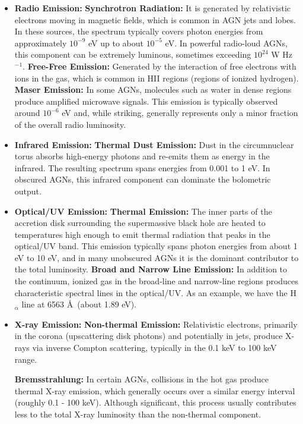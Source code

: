 \begin{itemize}
    \item \textbf{Radio Emission:}
    \subitem \textbf{Synchrotron Radiation:} It is generated by relativistic electrons moving in magnetic fields, which is common in AGN jets and lobes. In these sources, the spectrum typically covers photon energies from approximately $10^{-9}$ eV up to about $10^{-5}$ eV. In powerful radio-loud AGNs, this component can be extremely luminous, sometimes exceeding $10^{24}$ W Hz$^{-1}$.
    \subitem \textbf{Free-Free Emission:} Generated by the interaction of free electrons with ions in the gas, which is common in HII regions (regions of ionized hydrogen).
    \subitem \textbf{Maser Emission:} In some AGNs, molecules such as water in dense regions produce amplified microwave signals. This emission is typically observed around $10^{-6}$ eV and, while striking, generally represents only a minor fraction of the overall radio luminosity.
    
    \item \textbf{Infrared Emission:}
    \subitem \textbf{Thermal Dust Emission:} Dust in the circumnuclear torus absorbs high-energy photons and re-emits them as energy in the infrared. The resulting spectrum spans energies from 0.001 to 1 eV. In obscured AGNs, this infrared component can dominate the bolometric output.
    
    \item \textbf{Optical/UV Emission:}
    \subitem \textbf{Thermal Emission:} The inner parts of the accretion disk surrounding the supermassive black hole are heated to temperatures high enough to emit thermal radiation that peaks in the optical/UV band. This emission typically spans photon energies from about 1 eV to 10 eV, and in many unobscured AGNs it is the dominant contributor to the total luminosity.
    \subitem \textbf{Broad and Narrow Line Emission:} In addition to the continuum, ionized gas in the broad-line and narrow-line regions produces characteristic spectral lines in the optical/UV. As an example, we have the H$_{\alpha}$ line at 6563 \AA\ (about 1.89 eV).
    
    \item \textbf{X-ray Emission:}
    \subitem \textbf{Non-thermal Emission:} Relativistic electrons, primarily in the corona (upscattering disk photons) and potentially in jets, produce X-rays via inverse Compton scattering, typically in the 0.1 keV to 100 keV range.
    
    \subitem \textbf{Bremsstrahlung:} In certain AGNs, collisions in the hot gas produce thermal X-ray emission, which generally occurs over a similar energy interval (roughly 0.1 - 100 keV). Although significant, this process usually contributes less to the total X-ray luminosity than the non-thermal component.
    

\end{itemize}
